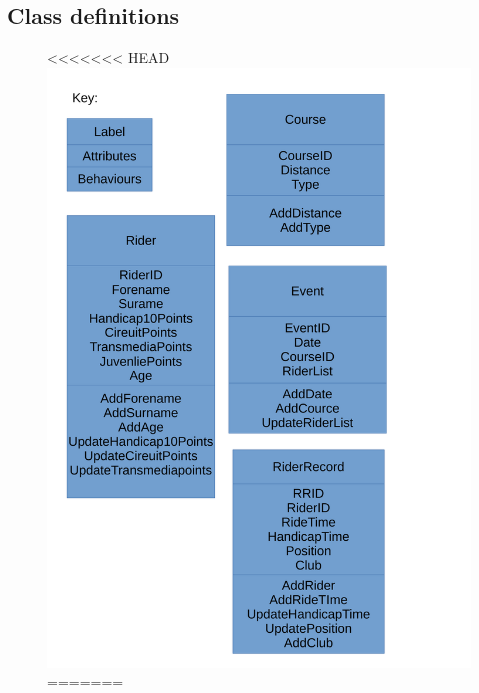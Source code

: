 \subsection{Class definitions}
\begin{figure}[H]
<<<<<<< HEAD
	\includegraphics[width=\textwidth]{./Class.pdf}
=======

\end{figure}
